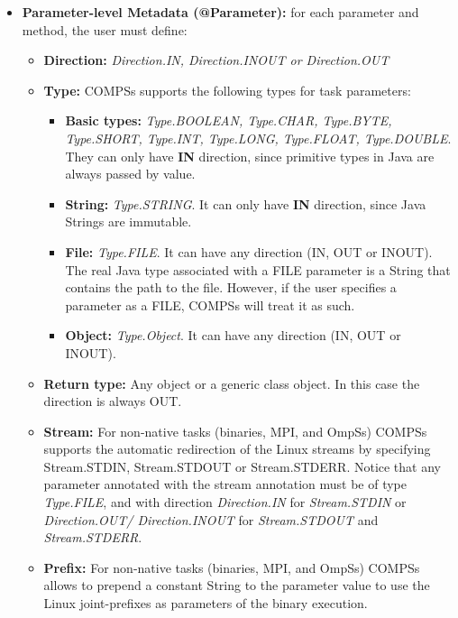 \begin{itemize}
 \item \textbf{Parameter-level Metadata (@Parameter):} for each parameter and method, the user must define:
       \begin{itemize}
        \item \textbf{Direction:} \textit{Direction.IN, Direction.INOUT or Direction.OUT}
        \item \textbf{Type:} COMPSs supports the following types for task parameters:
              \begin{itemize}
               \item \textbf{Basic types:} \textit{Type.BOOLEAN, Type.CHAR, Type.BYTE, Type.SHORT, Type.INT, Type.LONG,
                     Type.FLOAT, Type.DOUBLE}. They can only have \textbf{IN} direction, since primitive types in Java are
                     always passed by value.
               \item \textbf{String:} \textit{Type.STRING}. It can only have \textbf{IN} direction, since Java Strings are immutable.
               \item \textbf{File:} \textit{Type.FILE}. It can have any direction (IN, OUT or INOUT). The real Java type associated
                     with a FILE parameter is a String that contains the path to the file. However, if the user specifies
                     a parameter as a FILE, COMPSs will treat it as such.
               \item \textbf{Object:} \textit{Type.Object}. It can have any direction (IN, OUT or INOUT).
              \end{itemize}
        \item \textbf{Return type:} Any object or a generic class object. In this case the direction is always OUT.
        \item \textbf{Stream:} For non-native tasks (binaries, MPI, and OmpSs) COMPSs supports the automatic redirection of the Linux
        streams by specifying Stream.STDIN, Stream.STDOUT or Stream.STDERR. Notice that any parameter annotated with the stream annotation
        must be of type \textit{Type.FILE}, and with direction \textit{Direction.IN} for \textit{Stream.STDIN} or \textit{Direction.OUT/
        Direction.INOUT} for \newline \textit{Stream.STDOUT} and \textit{Stream.STDERR}. 
        \item \textbf{Prefix:} For non-native tasks (binaries, MPI, and OmpSs) COMPSs allows to prepend a constant String to the parameter
        value to use the Linux joint-prefixes as parameters of the binary execution.
       \end{itemize}


\end{itemize}

